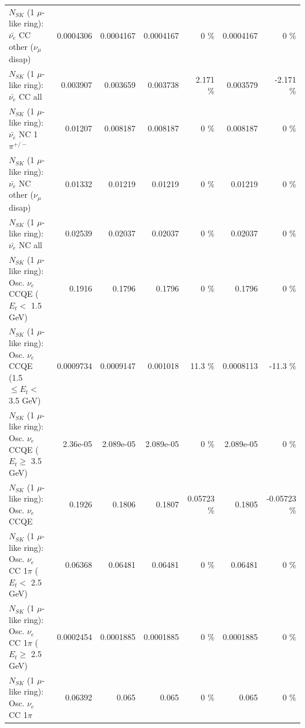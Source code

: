 \begin{table}
\begin{tabular}{| l | r | r | r  r | r  r |}
          $N_{SK}$ (1 $\mu$-like ring): $\bar{\nu_e}$ CC other ($\nu_\mu$ disap) &       0.0004306 &       0.0004167 &       0.0004167 &        0 \%  &       0.0004167 &        0 \%  \\ 
                            $N_{SK}$ (1 $\mu$-like ring): $\bar{\nu_{e}}$ CC all &        0.003907 &        0.003659 &        0.003738 &    2.171 \%  &        0.003579 &   -2.171 \%  \\ 
\hline
                     $N_{SK}$ (1 $\mu$-like ring): $\bar{\nu_e}$ NC 1$\pi^{+/-}$ &         0.01207 &        0.008187 &        0.008187 &        0 \%  &        0.008187 &        0 \%  \\ 
          $N_{SK}$ (1 $\mu$-like ring): $\bar{\nu_e}$ NC other ($\nu_\mu$ disap) &         0.01332 &         0.01219 &         0.01219 &        0 \%  &         0.01219 &        0 \%  \\ 
                            $N_{SK}$ (1 $\mu$-like ring): $\bar{\nu_{e}}$ NC all &         0.02539 &         0.02037 &         0.02037 &        0 \%  &         0.02037 &        0 \%  \\ 
\hline
\hline
\hline
             $N_{SK}$ (1 $\mu$-like ring): Osc. $\nu_e$ CCQE ($E_{t} <$ 1.5 GeV) &          0.1916 &          0.1796 &          0.1796 &        0 \%  &          0.1796 &        0 \%  \\ 
    $N_{SK}$ (1 $\mu$-like ring): Osc. $\nu_e$ CCQE (1.5 $\leq E_{t} <$ 3.5 GeV) &       0.0009734 &       0.0009147 &        0.001018 &     11.3 \%  &       0.0008113 &    -11.3 \%  \\ 
          $N_{SK}$ (1 $\mu$-like ring): Osc. $\nu_e$ CCQE ($E_{t} \geq$ 3.5 GeV) &        2.36e-05 &       2.089e-05 &       2.089e-05 &        0 \%  &       2.089e-05 &        0 \%  \\ 
\hline
                                 $N_{SK}$ (1 $\mu$-like ring): Osc. $\nu_e$ CCQE &          0.1926 &          0.1806 &          0.1807 &  0.05723 \%  &          0.1805 & -0.05723 \%  \\ 
\hline
        $N_{SK}$ (1 $\mu$-like ring): Osc. $\nu_e$ CC 1$\pi$ ($E_{t} <$ 2.5 GeV) &         0.06368 &         0.06481 &         0.06481 &        0 \%  &         0.06481 &        0 \%  \\ 
     $N_{SK}$ (1 $\mu$-like ring): Osc. $\nu_e$ CC 1$\pi$ ($E_{t} \geq$ 2.5 GeV) &       0.0002454 &       0.0001885 &       0.0001885 &        0 \%  &       0.0001885 &        0 \%  \\ 
\hline
                            $N_{SK}$ (1 $\mu$-like ring): Osc. $\nu_e$ CC 1$\pi$ &         0.06392 &           0.065 &           0.065 &        0 \%  &           0.065 &        0 \%  \\ 

\end{tabular}
\end{table}
